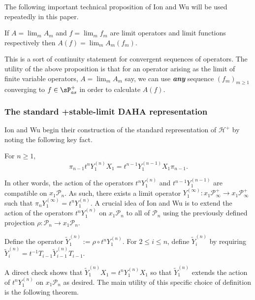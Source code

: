 The following important technical proposition of Ion and Wu will be used repeatedly in this paper. 

\begin{prop}
    If $A = \lim_{m} A_m$ and $f = \lim_{m} f_m$ are limit operators and limit functions respectively then $A(f) = \lim_{m} A_m(f_m).$
\end{prop}

This is a sort of continuity statement for convergent sequences of operators. The utility of the above proposition is that for an operator arising as the limit of finite variable operators, $A = \lim_{m} A_m$ say, we can use \textbf{\textit{any}} sequence $(f_m)_{m \geq 1}$ converging to $f \in \sP_{as}^{+}$ in order to calculate $A(f)$. 

\subsubsection{The standard +stable-limit DAHA representation}

Ion and Wu begin their construction of the standard representation of $\mathscr{H}^{+}$ by noting the following key fact. 

\begin{prop}
    For $n \geq 1$,  
    $$\pi_{n-1} t^n Y_1^{(n)}X_1 = t^{n-1} Y_1^{(n-1)}X_1\pi_{n-1}.$$
\end{prop}

In other words, the action of the operators $t^nY_1^{(n)}$ and $t^{n-1}Y_1^{(n-1)}$ are compatible on $x_1\mathscr{P}_{n}$. As such, there exists a limit operator $Y_1^{(\infty)}: x_1\mathscr{P}^{+}_{\infty} \rightarrow x_1\mathscr{P}^{+}_{\infty}$ such that $\pi_nY_1^{(\infty)} = t^nY_1^{(n)}$. A crucial idea of Ion and Wu is to extend the action of the operators $t^n Y_1^{(n)}$ on $x_1\mathscr{P}_{n}$ to all of $\mathscr{P}_{n}$ using the previously defined projection $\rho:\mathscr{P}_{n} \rightarrow x_1\mathscr{P}_{n}$.

\begin{defi} \label{defn of deformed y's}
    Define the operator $\widetilde{Y}_1^{(n)} :=  \rho \circ t^n Y_1^{(n)}$. For $2 \leq i \leq n$, define $\widetilde{Y}_i^{(n)}$ by requiring $\widetilde{Y}_i^{(n)} = t^{-1}T_{i-1}\widetilde{Y}_{i-1}^{(n)}T_{i-1}.$
\end{defi}

A direct check shows that $\widetilde{Y}_1^{(n)}X_1 = t^n Y_1^{(n)}X_1$ so that $\widetilde{Y}_1^{(n)}$ extends the action of $t^n Y_1^{(n)}$ on $x_1\mathscr{P}_{n}$ as desired. The main utility of this specific choice of definition is the following theorem.

